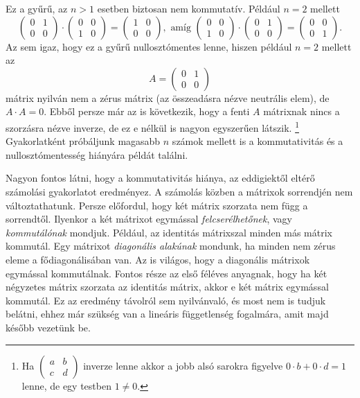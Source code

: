 \documentclass[9pt,showtrims]{memoir}
\theoremstyle{plain}
\theoremstyle{remark}
\theoremstyle{definition}
\begin{document}
Ez a gyűrű, az $n>1$ esetben biztosan nem kommutatív. 
Például $n=2$ mellett
\[
    \begin{pmatrix}
        0&1\\
        0&0
    \end{pmatrix}
    \cdot
    \begin{pmatrix}
        0&0\\
        1&0
    \end{pmatrix}
    =
    \begin{pmatrix}
        1&0\\
        0&0
    \end{pmatrix},
    \text{ amíg }
    \begin{pmatrix}
        0&0\\
        1&0
    \end{pmatrix}
    \cdot
    \begin{pmatrix}
        0&1\\
        0&0
    \end{pmatrix}
    =
    \begin{pmatrix}
        0&0\\
        0&1
    \end{pmatrix}.
\]
Az sem igaz, hogy ez a gyűrű nullosztómentes lenne, hiszen például $n=2$ mellett az
\[
    A
    =
    \begin{pmatrix}
        0&1\\
        0&0
    \end{pmatrix}
\]
mátrix nyilván nem a zérus mátrix (az összeadásra nézve neutrális elem), 
de $A\cdot A=0$. 
Ebből persze már az is következik, hogy a fenti $A$ mátrixnak nincs a szorzásra nézve inverze,
de ez e nélkül is nagyon egyszerűen látszik.%
\footnote{
    Ha 
    \(
        \begin{pmatrix}
            a&b\\
            c&d
        \end{pmatrix}
    \)
    inverze lenne akkor a jobb alsó sarokra figyelve $0\cdot b +0\cdot d=1$ lenne, de egy testben $1\neq 0$.
}
Gyakorlatként próbáljunk magasabb $n$ számok mellett is a kommutativitás és a nullosztómentesség hiányára 
példát találni.

Nagyon fontos látni, hogy a kommutativitás hiánya, az eddigiektől eltérő számolási gyakorlatot eredményez.
A számolás közben a mátrixok sorrendjén nem változtathatunk. 
Persze előfordul, hogy két mátrix szorzata nem függ a sorrendtől. 
Ilyenkor a két mátrixot egymással \emph{felcserélhetőnek}, vagy \emph{kommutálónak} mondjuk.
Például, az identitás mátrixszal minden más mátrix kommutál.
Egy mátrixot \emph{diagonális alakúnak} mondunk, 
ha minden nem zérus eleme a fődiagonálisában van.
Az is világos, hogy a diagonális mátrixok egymással kommutálnak.
Fontos része az első féléves anyagnak, hogy ha két négyzetes mátrix szorzata az identitás mátrix,
akkor e két mátrix egymással kommutál.
Ez az eredmény távolról sem nyilvánvaló, és most nem is tudjuk belátni, ehhez már szükség van a lineáris függetlenség fogalmára, amit majd később vezetünk be.
\end{document}
